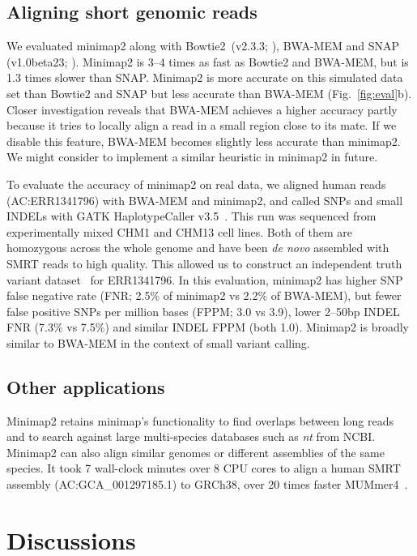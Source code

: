 \documentclass{bioinfo}
\begin{document}
\subsection{Aligning short genomic reads}

We evaluated minimap2 along with Bowtie2~(v2.3.3; \citealt{Langmead:2012fk}), BWA-MEM and
SNAP (v1.0beta23; \citealt{Zaharia:2011aa}). Minimap2 is 3--4 times as fast as Bowtie2 and
BWA-MEM, but is 1.3 times slower than SNAP. Minimap2 is more accurate on this
simulated data set than Bowtie2 and SNAP but less accurate than BWA-MEM
(Fig.~\ref{fig:eval}b). Closer investigation reveals that BWA-MEM achieves
a higher accuracy partly because it tries to locally align a read in a small
region close to its mate. If we disable this feature, BWA-MEM becomes slightly
less accurate than minimap2. We might consider to implement a similar heuristic
in minimap2 in future.

To evaluate the accuracy of minimap2 on real data, we aligned human reads
(AC:ERR1341796) with BWA-MEM and minimap2, and called SNPs and small INDELs
with GATK HaplotypeCaller v3.5~\citep{Depristo:2011vn}. This run was sequenced
from experimentally mixed CHM1 and CHM13 cell lines. Both of them are homozygous
across the whole genome and have been \emph{de novo} assembled with SMRT reads
to high quality. This allowed us to construct an independent truth variant
dataset~\citep{Li223297} for
ERR1341796. In this evaluation, minimap2 has higher SNP false negative rate
(FNR; 2.5\% of minimap2 vs 2.2\% of BWA-MEM), but fewer false positive SNPs per
million bases (FPPM; 3.0 vs 3.9), lower 2--50bp INDEL FNR (7.3\% vs 7.5\%) and
similar INDEL FPPM (both 1.0). Minimap2 is broadly similar to BWA-MEM in the
context of small variant calling.

\subsection{Other applications}

Minimap2 retains minimap's functionality to find overlaps between long reads
and to search against large multi-species databases such as \emph{nt} from
NCBI. Minimap2 can also align similar genomes or different assemblies of the
same species. It took 7 wall-clock minutes over 8 CPU cores to align a human
SMRT assembly (AC:GCA\_001297185.1) to GRCh38, over 20 times faster
MUMmer4~\citep{Kurtz:2004zr}.

\section{Discussions}
\end{document}
